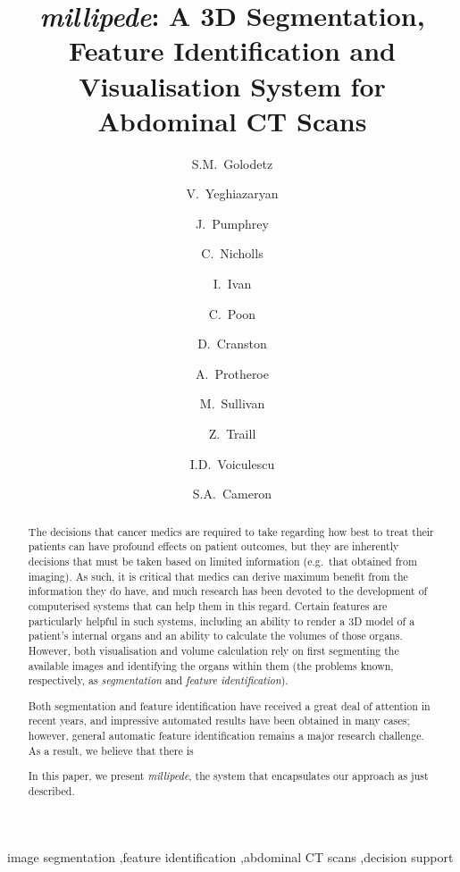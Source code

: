 \documentclass[preprint,a4paper]{elsarticle}
\begin{document}
\begin{frontmatter}

\title{\emph{millipede}: A 3D Segmentation, Feature Identification and Visualisation System for Abdominal CT Scans}

\author[ox]{S.M.~Golodetz}

\author[ox]{V.~Yeghiazaryan}
\author[ox]{J.~Pumphrey}
\author[ox]{C.~Nicholls}
\author[ox]{I.~Ivan}
\author[ox]{C.~Poon}
\author[ch]{D.~Cranston}
\author[ch]{A.~Protheroe}
\author[ch]{M.~Sullivan}
\author[ch]{Z.~Traill}

\author[ox]{I.D.~Voiculescu}

\author[ox]{S.A.~Cameron}


\address[ox]{Department of Computer Science, University of Oxford, Parks Road, Oxford OX1 3QD}
\address[ch]{Churchill Hospital, Old Road, Headington, Oxford OX3 7LE}

\begin{abstract}
The decisions that cancer medics are required to take regarding how best to treat their patients can have profound effects on patient outcomes, but they are inherently decisions that must be taken based on limited information (e.g.~that obtained from imaging). As such, it is critical that medics can derive maximum benefit from the information they do have, and much research has been devoted to the development of computerised systems that can help them in this regard. Certain features are particularly helpful in such systems, including an ability to render a 3D model of a patient's internal organs and an ability to calculate the volumes of those organs. However, both visualisation and volume calculation rely on first segmenting the available images and identifying the organs within them (the problems known, respectively, as \emph{segmentation} and \emph{feature identification}).

Both segmentation and feature identification have received a great deal of attention in recent years, and impressive automated results have been obtained in many cases; however, general automatic feature identification remains a major research challenge. As a result, we believe that there is 

In this paper, we present \emph{millipede}, the system that encapsulates our approach as just described.
\end{abstract}

\begin{keyword}
image segmentation \sep feature identification \sep abdominal CT scans \sep decision support
\end{keyword}

\end{frontmatter}
\end{document}
